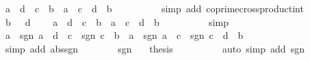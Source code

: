 \begin{isabellebody}
\ {\isachardoublequoteopen}{\isasymbar}a{\isasymbar}\ {\isacharasterisk}{\kern0pt}\ {\isasymbar}d{\isasymbar}\ {\isacharequal}{\kern0pt}\ {\isasymbar}c{\isasymbar}\ {\isacharasterisk}{\kern0pt}\ {\isasymbar}b{\isasymbar}\ {\isasymlongleftrightarrow}\ {\isasymbar}a{\isasymbar}\ {\isacharequal}{\kern0pt}\ {\isasymbar}c{\isasymbar}\ {\isasymand}\ {\isasymbar}d{\isasymbar}\ {\isacharequal}{\kern0pt}\ {\isasymbar}b{\isasymbar}{\isachardoublequoteclose}\isanewline
\ \ \ \ \ \ \ \ \isamarkupfalse%
\ {\isacharparenleft}{\kern0pt}simp\ add{\isacharcolon}{\kern0pt}\ coprime{\isacharunderscore}{\kern0pt}crossproduct{\isacharunderscore}{\kern0pt}int{\isacharparenright}{\kern0pt}\isanewline
\ \ \ \ \ \ \isamarkupfalse%
\ {\isacartoucheopen}b\ {\isachargreater}{\kern0pt}\ {}{\isacartoucheclose}\ {\isacartoucheopen}d\ {\isachargreater}{\kern0pt}\ {}{\isacartoucheclose}\ \isamarkupfalse%
\ {\isachardoublequoteopen}{\isasymbar}a{\isasymbar}\ {\isacharasterisk}{\kern0pt}\ d\ {\isacharequal}{\kern0pt}\ {\isasymbar}c{\isasymbar}\ {\isacharasterisk}{\kern0pt}\ b\ {\isasymlongleftrightarrow}\ {\isasymbar}a{\isasymbar}\ {\isacharequal}{\kern0pt}\ {\isasymbar}c{\isasymbar}\ {\isasymand}\ d\ {\isacharequal}{\kern0pt}\ b{\isachardoublequoteclose}\isanewline
\ \ \ \ \ \ \ \ \isamarkupfalse%
\ simp\isanewline
\ \ \ \ \ \ \isamarkupfalse%
\ \isamarkupfalse%
\ {\isachardoublequoteopen}a\ {\isacharasterisk}{\kern0pt}\ sgn\ a\ {\isacharasterisk}{\kern0pt}\ d\ {\isacharequal}{\kern0pt}\ c\ {\isacharasterisk}{\kern0pt}\ sgn\ c\ {\isacharasterisk}{\kern0pt}\ b\ {\isasymlongleftrightarrow}\ a\ {\isacharasterisk}{\kern0pt}\ sgn\ a\ {\isacharequal}{\kern0pt}\ c\ {\isacharasterisk}{\kern0pt}\ sgn\ c\ {\isasymand}\ d\ {\isacharequal}{\kern0pt}\ b{\isachardoublequoteclose}\isanewline
\ \ \ \ \ \ \ \ \isamarkupfalse%
\ {\isacharparenleft}{\kern0pt}simp\ add{\isacharcolon}{\kern0pt}\ abs{\isacharunderscore}{\kern0pt}sgn{\isacharparenright}{\kern0pt}\isanewline
\ \ \ \ \ \ \isamarkupfalse%
\ sgn\ {\isacharasterisk}{\kern0pt}\ \isamarkupfalse%
\ {\isacharquery}{\kern0pt}thesis\isanewline
\ \ \ \ \ \ \ \ \isamarkupfalse%
\ {\isacharparenleft}{\kern0pt}auto\ simp\ add{\isacharcolon}{\kern0pt}\ sgn{\isacharunderscore}{\kern0pt}{}{\isacharunderscore}{\kern0pt}{}{\isacharparenright}{\kern0pt}\isanewline
\ \ \ \ \isamarkupfalse%
\isanewline
\ \ \ \ \isamarkupfalse%

\end{isabellebody}
